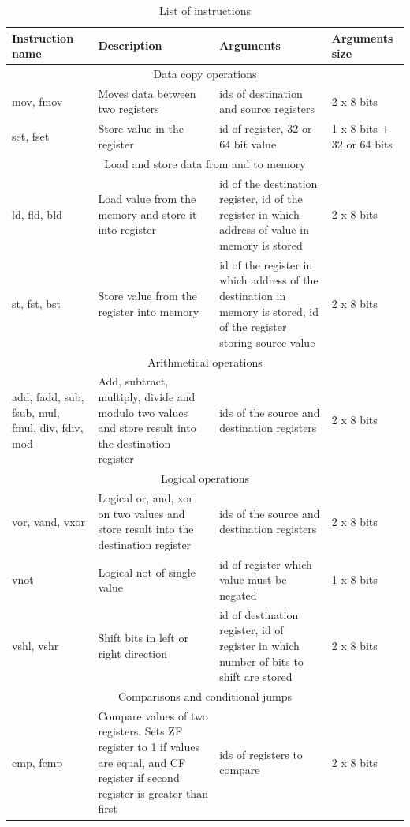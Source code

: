 \documentclass[oneside]{book}
\begin{document}
\begin{longtable}{ |p{2.5cm}||p{3cm}|p{3cm}|p{2cm}| }
\caption{List of instructions}\\    %
\hline
  Instruction name & Description & Arguments & Arguments size\\
 \hline
 \multicolumn{4}{|c|}{Data copy operations} \\
 \hline
  \hline 
	mov, fmov & Moves data between two registers & ids of destination and source registers & 2 x 8 bits\\
  \hline
	set, fset & Store value in the register & id of register, 32 or 64 bit value & 1 x 8 bits + 32 or 64 bits\\
  \hline  
  \multicolumn{4}{|c|}{Load and store data from and to memory} \\
 \hline
   \hline
 ld, fld, bld & Load value from the memory and store it into register & id of the destination register, id of the register in which address of value in memory is stored  &  2 x 8 bits \\
 \hline
 st, fst, bst & Store value from the register into memory & id of the register in which address of the destination in memory is stored, id of the register storing source value &  2 x 8 bits \\
 \hline
   \multicolumn{4}{|c|}{Arithmetical operations} \\
 \hline
   \hline
add, fadd, sub, fsub, mul, fmul, div, fdiv, mod & Add, subtract, multiply, divide and modulo two values and store result into the destination register  & ids of the source and destination registers &  2 x 8 bits \\
\hline
   \multicolumn{4}{|c|}{Logical operations} \\
 \hline
   \hline
vor, vand, vxor & Logical or, and, xor on two values and store result into the destination register  & ids of the source and destination registers &  2 x 8 bits \\
\hline
vnot & Logical not of single value & id of register which value must be negated & 1 x 8 bits \\ 
\hline
vshl, vshr & Shift bits in left or right direction & id of destination register, id of register in which number of bits to shift are stored& 2 x 8 bits \\ 
\hline
   \multicolumn{4}{|c|}{Comparisons and conditional jumps} \\
 \hline
   \hline
cmp, fcmp & Compare values of two registers. Sets ZF register to 1 if values are equal, and CF register if second register is greater than first & ids of registers to compare & 2 x 8 bits \\
\hline


\end{longtable}
\end{document}
